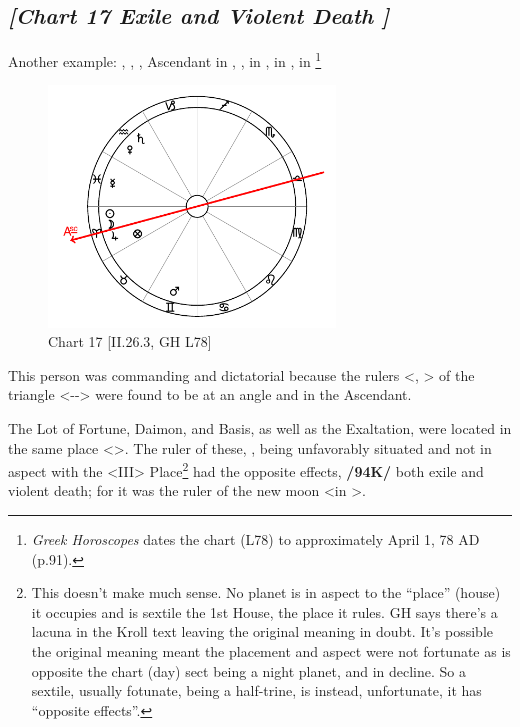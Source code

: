 \subsection*{\textit{[Chart 17 Exile and Violent Death ]}}

Another example: \Sun, \Moon, \Jupiter, Ascendant in \Aries, \Saturn, \Venus in \Aquarius, \Mars\xspace in \Gemini, \Mercury\xspace in \Pisces
\footnote{\textit{Greek Horoscopes} dates the chart (L78) to approximately April 1, 78 AD (p.91).}

\clearpage
\begin{figure}
\centering
\vspace{-20pt}
\includegraphics[width=0.68\textwidth]{charts/2_26_3}
\caption{Chart 17 [II.26.3, GH L78]}
\label{fig:chart17}
\end{figure}

This person was commanding and dictatorial because the rulers <\Sun, \Jupiter> of the triangle <\Leo-\Sagittarius-\Aries> were found to be at an angle and in the Ascendant. 

The Lot of Fortune, Daimon, and Basis, as well as the Exaltation, were located in the same place <\Aries>. The ruler of these, \Mars, being unfavorably situated and not in aspect with the <III> Place\footnote{This doesn't make much sense. No planet is in aspect to the ``place'' (house) it occupies and \Mars\xspace is sextile the 1st House, the place it rules. GH says there's a lacuna in the Kroll text leaving the original meaning in doubt. It's possible the original meaning meant the placement and aspect were not fortunate as \Mars\xspace is opposite the chart (day) sect being a night planet, and in decline. So a sextile, usually fotunate, being a half-trine, is instead, unfortunate, it has ``opposite effects''.} had the opposite effects,
\textbf{/94K/} both exile and violent death; for it was the ruler of the new moon <in \Aries>.


